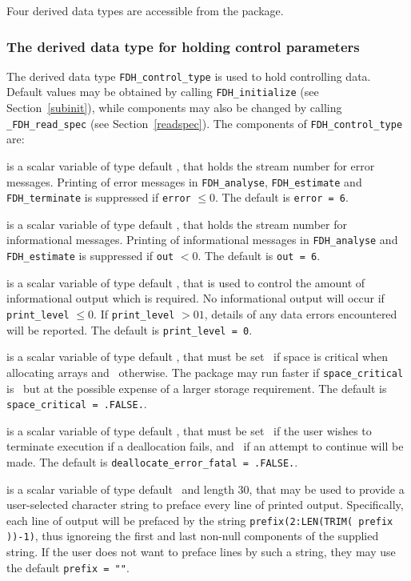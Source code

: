 \documentclass{galahad}
\newcommand{\packagename}{FDH}
\newcommand{\fullpackagename}{\libraryname\_\packagename}
\begin{document}

\galtypes
Four derived data types are accessible from the package.


\subsubsection{The derived data type for holding control
 parameters}\label{typecontrol}
The derived data type
{\tt \packagename\_control\_type}
is used to hold controlling data. Default values may be obtained by calling
{\tt \packagename\_initialize}
(see Section~\ref{subinit}),
while components may also be changed by calling
{\tt \fullpackagename\_read\-\_spec}
(see Section~\ref{readspec}).
The components of
{\tt \packagename\_control\_type}
are:


\begin{description}

 is a scalar variable of type default \integer, that holds the
stream number for error messages. Printing of error messages in
{\tt \packagename\_analyse},
{\tt \packagename\_estimate}
and {\tt \packagename\_terminate}
is suppressed if {\tt error} $\leq 0$.
The default is {\tt error = 6}.

 is a scalar variable of type default \integer, that holds the
stream number for informational messages. Printing of informational messages in
{\tt \packagename\_analyse} and {\tt \packagename\_estimate}
is suppressed if {\tt out} $< 0$.
The default is {\tt out = 6}.

 is a scalar variable of type default \integer, that is used
to control the amount of informational output which is required. No
informational output will occur if {\tt print\_level} $\leq 0$. If
{\tt print\_level} $> 01$, details of any data errors encountered
will be reported.
The default is {\tt print\_level = 0}.

 is a scalar variable of type default \logical,
that must be set \true\ if space is critical when allocating arrays
and  \false\ otherwise. The package may run faster if
{\tt space\_critical} is \false\ but at the possible expense of a larger
storage requirement. The default is {\tt space\_critical = .FALSE.}.

 is a scalar variable of type default \logical,
that must be set \true\ if the user wishes to terminate execution if
a deallocation  fails, and \false\ if an attempt to continue
will be made. The default is {\tt deallocate\_error\_fatal = .FALSE.}.

 is a scalar variable of type default \character\
and length 30, that may be used to provide a user-selected
character string to preface every line of printed output.
Specifically, each line of output will be prefaced by the string
{\tt prefix(2:LEN(TRIM( prefix ))-1)},
thus ignoreing the first and last non-null components of the
supplied string. If the user does not want to preface lines by such
a string, they may use the default {\tt prefix = ""}.

\end{description}
\end{document}
